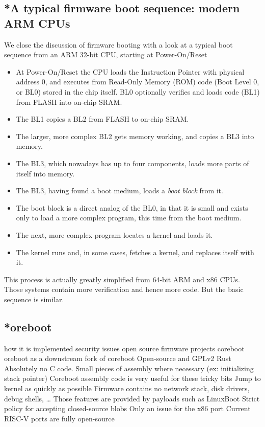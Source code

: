 \documentclass[conference]{IEEEtran}
\begin{document}
\subsection{*A typical firmware boot sequence: modern ARM CPUs}
We close the discussion of firmware booting with a look at a typical boot sequence from an ARM 32-bit CPU, starting at Power-On/Reset

\begin{itemize}
    \item At Power-On/Reset the CPU loads the Instruction Pointer with physical address 0, and executes from Read-Only Memory (ROM) code (Boot Level 0, or BL0) stored in the chip itself. BL0 optionally verifies and loads code (BL1) from FLASH into on-chip SRAM.
    \item The BL1 copies a BL2 from FLASH to on-chip SRAM.
    \item The larger, more complex BL2 gets memory working, and copies a BL3 into memory.
    \item The BL3, which nowadays has up to four components, loads more parts of itself into memory.
    \item The BL3, having found a boot medium, loads a \textit{boot block} from it.
    \item The boot block is a direct analog of the BL0, in that it is small and exists only to load a more complex program, this time from the boot medium.
    \item The next, more complex program locates a kernel and loads it.
    \item The kernel runs and, in some cases, fetches a kernel, and replaces itself with it.
\end{itemize}

This process is actually greatly simplified from 64-bit ARM and x86 CPUs. Those systems contain more verification and hence more code. But the basic sequence is similar.

\subsection{*oreboot}

how it is implemented 
security issues 
open source firmware projects
coreboot
oreboot as a downstream fork of coreboot\cite{minnich2000linux}
Open-source and GPLv2
Rust
Absolutely no C code.
Small pieces of assembly where necessary (ex: initializing stack pointer)
Coreboot assembly code is very useful for these tricky bits
Jump to kernel as quickly as possible
Firmware contains no network stack, disk drivers, debug shells, …
Those features are provided by payloads such as LinuxBoot
Strict policy for accepting closed-source blobs
Only an issue for the x86 port
Current RISC-V ports are fully open-source
\end{document}
